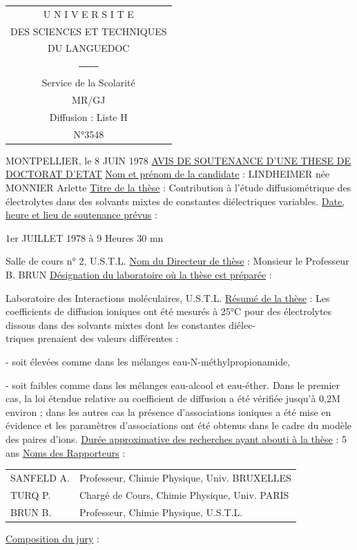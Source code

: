 \begin{tabular}{c}
U N I V E R S I T E\\
DES SCIENCES ET TECHNIQUES\\
DU LANGUEDOC\\
\texttt{------------}\\
Service de la Scolarité\\
MR/GJ\\
Diffusion : Liste H\\
N°3548
\end{tabular}

MONTPELLIER, le 8 JUIN 1978
\uline{AVIS DE SOUTENANCE D'UNE THESE DE DOCTORAT D'ETAT}
\uline{Nom et prénom de la candidate} : LINDHEIMER née MONNIER Arlette
\uline{Titre de la thèse} : Contribution à l'étude diffusiométrique des électrolytes dans des solvants mixtes de constantes diélectriques variables.
\uline{Date, heure et lieu de soutenance prévus} :

1er JUILLET 1978 à 9 Heures 30 mn

Salle de cours n° 2, U.S.T.L.
\uline{Nom du Directeur de thèse} : Monsieur le Professeur B. BRUN
\uline{Désignation du laboratoire où la thèse est préparée} :

Laboratoire des Interactions moléculaires, U.S.T.L.
\uline{Résumé de la thèse} : Les coefficients de diffusion ioniques ont été mesurés à 25°C pour des électrolytes dissous dans des solvants mixtes dont les constantes diélec-\\
triques prenaient des valeurs différentes :

- soit élevées comme dans les mélanges eau-N-méthylpropionamide,

- soit faibles comme dans les mélanges eau-alcool et eau-éther.
Dans le premier cas, la loi étendue relative au coefficient de diffusion a été vérifiée jusqu'à 0,2M environ ; dans les autres cas la présence d'associations ioniques a été mise en évidence et les paramètres d'associations ont été obtenus dans le cadre du modèle des paires d'ions.
\uline{Durée approximative des recherches ayant abouti à la thèse} : 5 ans
\uline{Noms des Rapporteurs} :

\begin{tabular}{ll}
SANFELD A. & Professeur, Chimie Physique, Univ. BRUXELLES\\
TURQ P. & Chargé de Cours, Chimie Physique, Univ. PARIS\\
BRUN B. & Professeur, Chimie Physique, U.S.T.L.
\end{tabular}
\uline{Composition du jury} :

